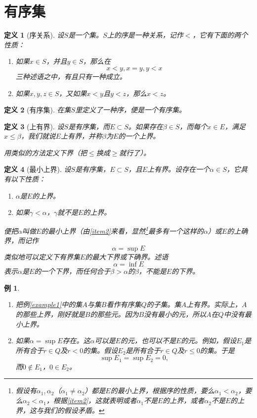 \documentclass[UTF8]{ctexbook}
\newtheorem{example}{例}[chapter]
\newtheorem{definition}{定义}[chapter]
\begin{document}
\section{有序集}

\begin{definition}[序关系]
设$S$是一个集。$S$上的序是一种关系，记作$<$，它有下面的两个性质：
\begin{enumerate}
\item 如果$x \in S$，并且$y \in S$，那么在$$x < y, x = y, y < x$$三种述语之中，有且只有一种成立。
\item 如果$x, y, z \in S$，又如果$x < y$且$y < z$，那么$x < z$。
\end{enumerate}
\end{definition}

\begin{definition}[有序集]
在集$S$里定义了一种序，便是一个有序集。
\end{definition}

\begin{definition}[上有界]
设$S$是有序集，而$E \subset S$。如果存在$\beta \in S$，而每个$x \in E$，满足$x \leqslant \beta$，我们就说$E$上有界，并称$\beta$为$E$的一个上界。

用类似的方法定义下界（把$\leqslant$换成$\geqslant$就行了）。
\end{definition}

\begin{definition}[最小上界]
设$S$是有序集，$E \subset S$，且$E$上有界。设存在一个$\alpha \in S$，它具有以下性质：
\begin{enumerate}
\item $\alpha$是$E$的上界。
\item 如果$\gamma < \alpha$，$\gamma$就不是$E$的上界。\label{item2}
\end{enumerate}
便把$\alpha$叫做$E$的最小上界（由\ref{item2}来看，显然\footnote{假设有$\alpha_1,\alpha_2$（$\alpha_1 \neq \alpha_2$）都是$E$的最小上界，根据序的性质，要么$\alpha_1 < \alpha_2$，要么$\alpha_2 < \alpha_1$，根据\ref{item2}，这就表明或者$\alpha_1$不是$E$的上界，或者$\alpha_2$不是$E$的上界，这与我们的假设矛盾。}最多有一个这样的$\alpha$）或$E$的上确界，而记作$$\alpha = \sup{E}$$
类似地可以定义下有界集$E$的最大下界或下确界。述语$$\alpha = \inf{E}$$表示$\alpha$是$E$的一个下界，而任何合于$\beta > \alpha$的$\beta$，不能是$E$的下界。
\end{definition}

\begin{example}
\label{example2}\hfill
\begin{enumerate}[a]
\item 把例\ref{example1}中的集$A$与集$B$看作有序集$Q$的子集。集$A$上有界。实际上，$A$的那些上界，刚好就是$B$的那些元。因为$B$没有最小的元，所以$A$在$Q$中没有最小上界。\label{item1}
\item 如果$\alpha = \sup{E}$存在。这$\alpha$可以是$E$的元，也可以不是$E$的元。例如，假设$E_1$是所有合于$r \in Q$及$r < 0$的集。假设$E_2$是所有合于$r \in Q$及$r \leqslant 0$的集。于是$$\sup{E_1} = \sup{E_2} = 0,$$而$0 \notin E_1$，$0 \in E_2$。
\end{enumerate}
\end{example}
\end{document}
